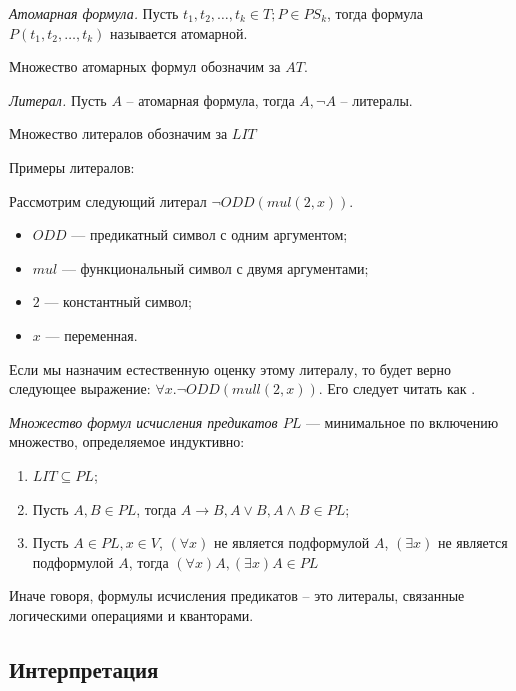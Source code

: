 \begin{definition}
  \emph{Атомарная формула.} Пусть $t_1, t_2, \ldots, t_k \in T; P \in PS_k$, тогда формула $P(t_1, t_2, \ldots, t_k)$ называется атомарной.
\end{definition}

Множество атомарных формул обозначим за $AT$. 

\begin{definition}
  \emph{Литерал.} Пусть $A$ -- атомарная формула, тогда $A, \neg A$ -- литералы.
\end{definition}

Множество литералов обозначим за $LIT$

Примеры литералов:
\begin{example}
Рассмотрим следующий литерал $\neg ODD(mul(2,x))$.  
\begin{itemize}[label=$\star$]
	\item $ODD$ --- предикатный символ с одним аргументом;
    \item $mul$ --- функциональный символ с двумя аргументами;
    \item $2$ --- константный символ;
    \item $x$ --- переменная.
\end{itemize}
Если мы назначим естественную оценку этому литералу, то будет верно следующее выражение: $\forall x.\neg ODD(mull(2, x))$. Его следует читать как .
\end{example}

\begin{definition}
  \emph{Множество формул исчисления предикатов $PL$} --- минимальное по включению множество, определяемое индуктивно:
  \begin{enumerate}
  	\item $LIT \subseteq PL$;
    \item Пусть $A, B \in PL$, тогда $A \to B, A \vee B, A \wedge B \in PL$;
    \item Пусть $A \in PL, x \in V$, $(\forall x)$ не является подформулой $A$, $(\exists x)$ не является подформулой $A$, тогда $(\forall x)A, (\exists x)A \in PL$
  \end{enumerate}
\end{definition}

Иначе говоря, формулы исчисления предикатов -- это литералы, связанные логическими операциями и кванторами.

\subsection{Интерпретация}

